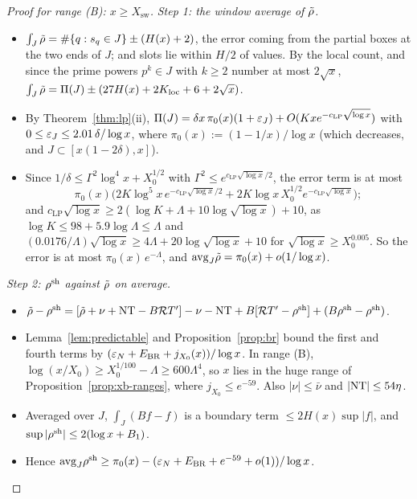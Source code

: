 \begin{proof}[Proof for range \textup{(B)}: $x\ge X_{\mathrm{sw}}$]
\emph{Step 1: the window average of $\tilde\rho$.}
\begin{itemize}
\item $\int_J\tilde\rho=\#\{q:s_q\in J\}\pm(H(x)+2)$, the error coming from the partial boxes at the two ends of $J$; and slots lie
  within $H/2$ of values.
  By the local count, and since the prime powers
  $p^k\in J$ with $k\ge2$ number at most $2\sqrt x$, $\int_J\tilde\rho=\Pi(J)\pm(27H(x)+2K_{\mathrm{loc}}+6+2\sqrt x)$.
\item By Theorem~\ref{thm:lp}(ii), $\Pi(J)=\delta x\,\pi_0(x)(1+\varepsilon_J)+O(Kxe^{-c_{\mathrm{LP}}\sqrt{\log x}})$ with
  $0\le\varepsilon_J\le2.01\,\delta/\log x$, where $\pi_0(x):=(1-1/x)/\log x$ (which decreases, and $J\subset[x(1-2\delta),x]$).
\item Since $1/\delta\le\Gamma^2\log^4x+X_0^{1/2}$ with $\Gamma^2\le e^{c_{\mathrm{LP}}\sqrt{\log x}/2}$, the error term is at most
  \[
    \pi_0(x)\bigl(2K\log^5x\,e^{-c_{\mathrm{LP}}\sqrt{\log x}/2}+2K\log x\,X_0^{1/2}e^{-c_{\mathrm{LP}}\sqrt{\log x}}\bigr);
  \]
  and
  $c_{\mathrm{LP}}\sqrt{\log x}\ge2(\log K+\Lambda+10\log\sqrt{\log x})+10$, as $\log K\le98+5.9\log\Lambda\le\Lambda$ and
  $(0.0176/\Lambda)\sqrt{\log x}\ge4\Lambda+20\log\sqrt{\log x}+10$ for $\sqrt{\log x}\ge X_0^{0.005}$. So the error is at most
  $\pi_0(x)\,e^{-\Lambda}$, and $\mathrm{avg}_J\tilde\rho=\pi_0(x)+o(1/\log x)$.
\end{itemize}

\emph{Step 2: $\rho^{\mathrm{sh}}$ against $\tilde\rho$ on average.}
\begin{itemize}
\item $\tilde\rho-\rho^{\mathrm{sh}}=[\tilde\rho+\nu+\mathrm{NT}-B\mathcal{R} T']-\nu-\mathrm{NT}+B[\mathcal{R} T'-\rho^{\mathrm{sh}}]+(B\rho^{\mathrm{sh}}-\rho^{\mathrm{sh}})$.
\item Lemma~\ref{lem:predictable} and Proposition~\ref{prop:br} bound the first and fourth terms by
  $(\varepsilon_N+E_{\mathrm{BR}}+j_{X_0}(x))/\log x$. In range (B), $\log(x/X_0)\ge X_0^{1/100}-\Lambda\ge600\Lambda^4$, so $x$ lies in
  the huge range of Proposition~\ref{prop:xb-ranges}, where $j_{X_0}\le e^{-59}$. Also $|\nu|\le\bar\nu$ and $|\mathrm{NT}|\le54\eta$.
\item Averaged over $J$, $\int_J(Bf-f)$ is a boundary term $\le2H(x)\sup|f|$, and $\sup|\rho^{\mathrm{sh}}|\le2(\log x+B_1)$.
\item Hence $\mathrm{avg}_J\rho^{\mathrm{sh}}\ge\pi_0(x)-(\varepsilon_N+E_{\mathrm{BR}}+e^{-59}+o(1))/\log x$.
\end{itemize}


\end{proof}
